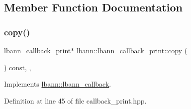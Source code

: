 \subsection{Member Function Documentation}
\mbox{\label{classlbann_1_1lbann__callback__print_aa75e076c3d840a2186825be2e8dbac8c}} 
\subsubsection{\texorpdfstring{copy()}{copy()}}
{\footnotesize\ttfamily \hyperlink{classlbann_1_1lbann__callback__print}{lbann\+\_\+callback\+\_\+print}$\ast$ lbann\+::lbann\+\_\+callback\+\_\+print\+::copy (\begin{DoxyParamCaption}{ }\end{DoxyParamCaption}) const\hspace{0.3cm}{\ttfamily [inline]}, {\ttfamily [override]}, {\ttfamily [virtual]}}



Implements \hyperlink{classlbann_1_1lbann__callback_a9f545d1269a8c7af335625d049691f26}{lbann\+::lbann\+\_\+callback}.



Definition at line 45 of file callback\+\_\+print.\+hpp.


